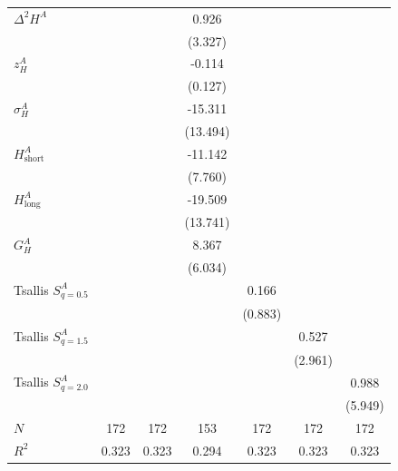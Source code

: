 \begin{table}[htbp]
\begin{tabular}{lcccccc}
  $\Delta^2 H^A$ &  &  & 0.926 &  &  &  \\
  &  &  & (3.327) &  &  &  \\[2pt]
  $z^A_H$ &  &  & -0.114 &  &  &  \\
  &  &  & (0.127) &  &  &  \\[2pt]
  $\sigma^A_H$ &  &  & -15.311 &  &  &  \\
  &  &  & (13.494) &  &  &  \\[2pt]
  $H^A_{\mathrm{short}}$ &  &  & -11.142 &  &  &  \\
  &  &  & (7.760) &  &  &  \\[2pt]
  $H^A_{\mathrm{long}}$ &  &  & -19.509 &  &  &  \\
  &  &  & (13.741) &  &  &  \\[2pt]
  $G^A_H$ &  &  & 8.367 &  &  &  \\
  &  &  & (6.034) &  &  &  \\[2pt]
  Tsallis $S^A_{q=0.5}$ &  &  &  & 0.166 &  &  \\
  &  &  &  & (0.883) &  &  \\[2pt]
  Tsallis $S^A_{q=1.5}$ &  &  &  &  & 0.527 &  \\
  &  &  &  &  & (2.961) &  \\[2pt]
  Tsallis $S^A_{q=2.0}$ &  &  &  &  &  & 0.988 \\
  &  &  &  &  &  & (5.949) \\[2pt]
\midrule
  $N$ & 172 & 172 & 153 & 172 & 172 & 172 \\
  $R^2$ & 0.323 & 0.323 & 0.294 & 0.323 & 0.323 & 0.323 \\
\bottomrule
\end{tabular}
\end{table}